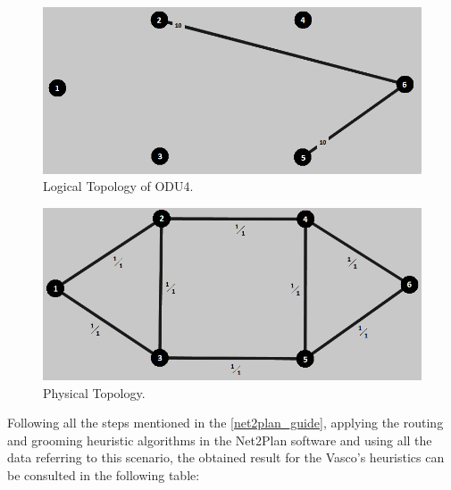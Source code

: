 \begin{figure}[H]
\centering
\includegraphics[width=13cm]{sdf/heuristic/figures/topologies/opaque_surv/medium/logical_topology_odu4_medium}
\caption{Logical Topology of ODU4.}
\label{logical_ODU4_surv_ref_medium_heuristic}
\end{figure}

\begin{figure}[H]
\centering
\includegraphics[width=13cm]{sdf/heuristic/figures/topologies/opaque_surv/medium/physical_topology_medium}
\caption{Physical Topology.}
\label{physical_topology_surv_ref_medium_heuristic}
\end{figure}

Following all the steps mentioned in the \ref{net2plan_guide}, applying the routing and grooming heuristic algorithms in the Net2Plan software and using all the data referring to this scenario, the obtained result for the Vasco's heuristics can be consulted in the following table:

